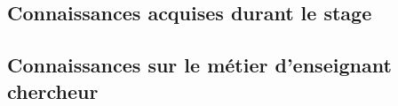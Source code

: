 \subsection{Connaissances acquises durant le stage}
    
    \label{sub:Connaissances acquises durant le stage}
    \subsection{Connaissances sur le m\'etier d'enseignant chercheur} 
    \label{sub:Connaissances sur le m\'etier d'enseignant chercheur}